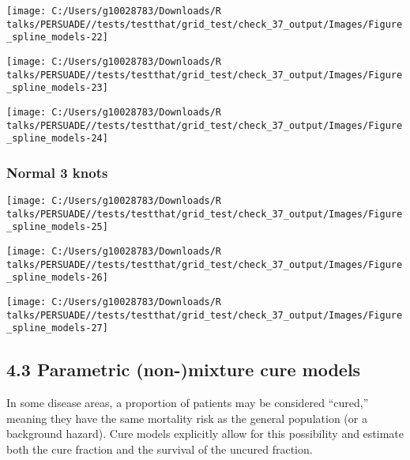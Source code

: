 \documentclass[
]{article}
\begin{document}
\begin{flushleft}\texttt{[image: C:/Users/g10028783/Downloads/R talks/PERSUADE//tests/testthat/grid\_test/check\_37\_output/Images/Figure\_spline\_models-22]} \end{flushleft}

\begin{flushleft}\texttt{[image: C:/Users/g10028783/Downloads/R talks/PERSUADE//tests/testthat/grid\_test/check\_37\_output/Images/Figure\_spline\_models-23]} \end{flushleft}

\begin{flushleft}\texttt{[image: C:/Users/g10028783/Downloads/R talks/PERSUADE//tests/testthat/grid\_test/check\_37\_output/Images/Figure\_spline\_models-24]} \end{flushleft}

\clearpage

\subsubsection{Normal 3 knots}\label{normal-3-knots}

\begin{flushleft}\texttt{[image: C:/Users/g10028783/Downloads/R talks/PERSUADE//tests/testthat/grid\_test/check\_37\_output/Images/Figure\_spline\_models-25]} \end{flushleft}

\begin{flushleft}\texttt{[image: C:/Users/g10028783/Downloads/R talks/PERSUADE//tests/testthat/grid\_test/check\_37\_output/Images/Figure\_spline\_models-26]} \end{flushleft}

\begin{flushleft}\texttt{[image: C:/Users/g10028783/Downloads/R talks/PERSUADE//tests/testthat/grid\_test/check\_37\_output/Images/Figure\_spline\_models-27]} \end{flushleft}

\clearpage

\subsection{4.3 Parametric (non-)mixture cure
models}\label{parametric-non-mixture-cure-models}

In some disease areas, a proportion of patients may be considered
``cured,'' meaning they have the same mortality risk as the general
population (or a background hazard). Cure models explicitly allow for
this possibility and estimate both the cure fraction and the survival of
the uncured fraction.
\end{document}
